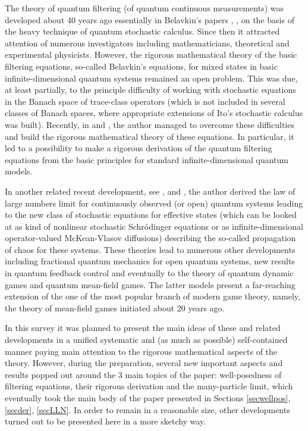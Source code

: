\documentclass[12pt]{article}
\begin{document}
The theory of quantum filtering (of quantum continuous measurements) was developed
about 40 years ago  essentially in Belavkin's papers  \cite{Bel87}, \cite{Bel88}, \cite{Bel92}
on the basis of the heavy technique of quantum stochastic calculus.
Since then it attracted attention of numerous investigators including mathematicians,
theoretical and experimental physicists. However, the rigorous mathematical theory
of the basic filtering equations, so-called Belavkin's equations, for mixed
states in basic infinite-dimensional quantum systems remained an open problem.
This was due, at least partially, to the principle difficulty of working with
stochastic equations in the Banach space of trace-class operators (which is not
included in several classes of Banach spaces, where appropriate extensions of Ito's
stochastic calculus was built). Recently, in \cite{Kol25a} and \cite{Kol25b},
 the author managed to overcome these difficulties
and build the rigorous mathematical theory of these equations. In particular,
it led to a possibility to make a rigorous derivation of the quantum filtering equations
from the basic principles for standard infinite-dimensional quantum models.

In another related recent development, see \cite{KolQuantLLN},
 \cite{KolQuantMFGCount} and \cite{KolQuantMFG},
 the author derived the law of large numbers limit for
continuously observed (or open) quantum systems leading to the new class of stochastic
equations for effective states (which can be looked at as kind of nonlinear stochastic
Schr\'odinger equations or as infinite-dimensional operator-valued McKean-Vlasov diffusions)
describing the so-called propagation of chaos for these systems. These theories lead to
numerous other developments including fractional quantum mechanics for open quantum systems,
new results in quantum feedback control and eventually to the theory of quantum dynamic
games and quantum mean-field games. The latter models present a far-reaching extension
of the one of the most popular branch of modern game theory, namely, the theory of
mean-field games initiated about 20 years ago.

In this survey it was planned to present the main ideas of these and related developments in a unified
systematic and (as much as possible) self-contained manner paying main attention to the
rigorous mathematical aspects of the theory. However, during the preparation, several
new important aspects and results popped out around the 3 main topics of the paper: well-posedness
of filtering equations, their rigorous derivation and the many-particle  limit, which eventually took
the main body of the paper presented in Sections \ref{secwellpos}, \ref{secder}, \ref{secLLN}.
In order to remain in a reasonable size, other developments turned out to be presented here
in a more sketchy way.
\end{document}
